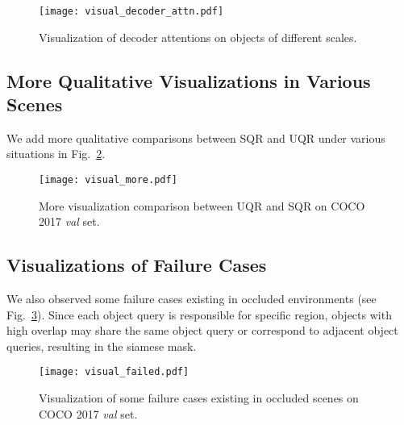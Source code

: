 \documentclass{article}
\begin{document}
\begin{figure}[h]
\centering
\texttt{[image: visual\_decoder\_attn.pdf]}
\caption{Visualization of decoder attentions on objects of different scales.}
\label{fig:visual_decoder_attn}
\end{figure}

\subsection{More Qualitative Visualizations in Various Scenes}
\label{visual_more}
We add more qualitative comparisons between SQR and UQR under various situations in Fig.~\ref{fig:visual_more}. \vspace{-0.5cm}

\begin{figure}[h]
\centering
\texttt{[image: visual\_more.pdf]}
\caption{More visualization comparison between UQR and SQR on COCO 2017 \textit{val} set.}
\label{fig:visual_more}
\end{figure}

\subsection{Visualizations of Failure Cases}
\label{visual_failed}
We also observed some failure cases existing in occluded environments (see Fig.~\ref{fig:visual_failed}). Since each object query is responsible for specific region, objects with high overlap may share the same object query or correspond to adjacent object queries, resulting in the siamese mask.

\begin{figure}[th]
\centering
\texttt{[image: visual\_failed.pdf]}\vspace{-0.1cm}
\caption{Visualization of some failure cases existing in occluded scenes on COCO 2017 \textit{val} set.}
\label{fig:visual_failed}
\end{figure}
\end{document}
